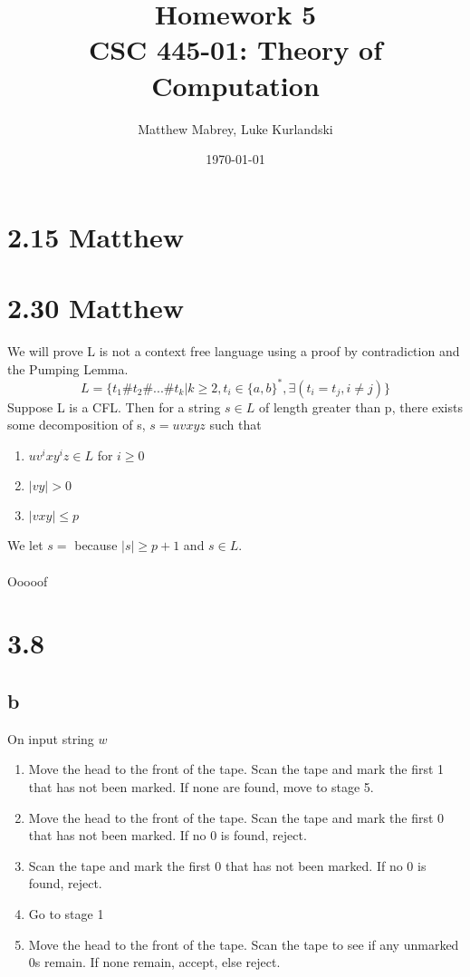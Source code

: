 \documentclass{article}
\title{Homework 5\\[0.2em]\smaller{}CSC 445-01: Theory of Computation}
\author{Matthew Mabrey, Luke Kurlandski}
\date{\today}
\begin{document}
\maketitle

\section*{2.15 Matthew}

\section*{2.30 Matthew}

We will prove L is not a context free language using a proof by contradiction and the Pumping Lemma.
$$L = \{ t_1\#t_2\#...\#t_k | k \geq 2, t_i \in \{ a, b\}^*, \exists ( t_i = t_j,  i \neq j ) \}$$
Suppose L is a CFL. Then for a string $s \in L$ of length greater than p, there exists some decomposition of s, $s = uvxyz$ such that 
\begin{enumerate}
    \item $uv^ixy^iz \in L$ for $i \geq 0$
    \item $|vy| > 0$
    \item $|vxy| \leq p$
\end{enumerate}
We let $s = $ because $|s| \geq p + 1$ and $s \in L$.\\\\

Ooooof

\section*{3.8}
\subsection*{b}
On input string $w$
\begin{enumerate}
    \item Move the head to the front of the tape. Scan the tape and mark the first 1 that has not been marked. If none are found, move to stage 5.
    \item Move the head to the front of the tape. Scan the tape and mark the first 0 that has not been marked. If no 0 is found, reject. 
    \item Scan the tape and mark the first 0 that has not been marked. If no 0 is found, reject.
    \item Go to stage 1
    \item Move the head to the front of the tape. Scan the tape to see if any unmarked 0s remain. If none remain, accept, else reject. 
\end{enumerate}
\end{document}

